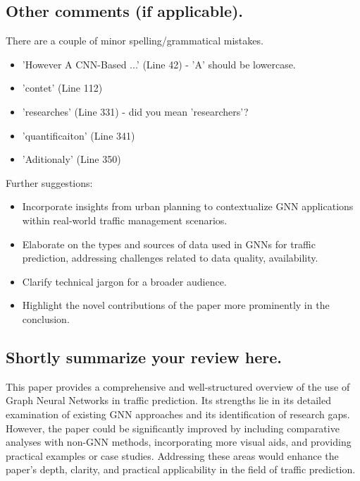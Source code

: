 \documentclass[12pt]{article}
\begin{document}
\subsection*{Other comments (if applicable).}
There are a couple of minor spelling/grammatical mistakes.
\begin{itemize}
    \item 'However A CNN-Based ...' (Line 42) - 'A' should be lowercase.
    \item 'contet' (Line 112) 
    \item 'researches' (Line 331) - did you mean 'researchers'?
    \item 'quantificaiton' (Line 341)
    \item 'Aditionaly' (Line 350)
\end{itemize}

Further suggestions:
\begin{itemize}
    \item Incorporate insights from urban planning to contextualize GNN applications within real-world traffic management scenarios.
    \item Elaborate on the types and sources of data used in GNNs for traffic prediction, addressing challenges related to data quality, availability.
    \item Clarify technical jargon for a broader audience.
    \item Highlight the novel contributions of the paper more prominently in the conclusion.
\end{itemize}

\subsection*{Shortly summarize your review here.}
This paper provides a comprehensive and well-structured overview of the use of Graph Neural Networks in traffic prediction. 
Its strengths lie in its detailed examination of existing GNN approaches and its identification of research gaps. However, the paper could be significantly improved by including comparative analyses with non-GNN methods, incorporating more visual aids, and providing practical examples or case studies. Addressing these areas would enhance the paper's depth, clarity, and practical applicability in the field of traffic prediction.
\end{document}
